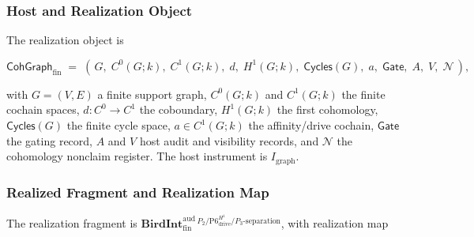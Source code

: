 \documentclass[11pt]{article}
\theoremstyle{definition}
\begin{document}
\subsubsection{Host and Realization Object}

The realization object is

\[
\mathsf{CohGraph}_{\mathrm{fin}}\;=\;(\,G,\;C^{0}(G;k),\;C^{1}(G;k),\;d,\;H^{1}(G;k),\;\mathsf{Cycles}(G),\;a,\;\mathsf{Gate},\;A,\;V,\;\mathcal N\,),
\]

with \(G=(V,E)\) a finite support graph, \(C^{0}(G;k)\) and \(C^{1}(G;k)\) the finite cochain spaces, \(d:C^{0}\to C^{1}\) the coboundary, \(H^{1}(G;k)\) the first cohomology, \(\mathsf{Cycles}(G)\) the finite cycle space, \(a\in C^{1}(G;k)\) the affinity/drive cochain, \(\mathsf{Gate}\) the gating record, \(A\) and \(V\) host audit and visibility records, and \(\mathcal N\) the cohomology nonclaim register. The host instrument is \(I_{\mathrm{graph}}\).

\subsubsection{Realized Fragment and Realization Map}

The realization fragment is \(\mathbf{BirdInt}^{\mathrm{aud}}_{\mathrm{fin}}{}^{\,P_{2}/\mathrm{P6}_{\mathrm{drive}}^{H^{1}}/P_{3}\text{-separation}}\), with realization map
\end{document}
